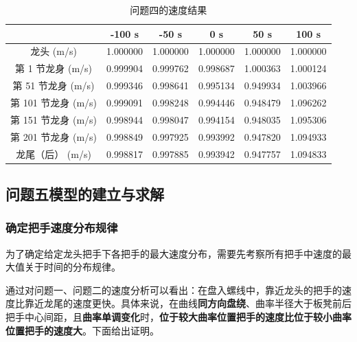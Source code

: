\documentclass[a4paper]{article}
\begin{document}
		\begin{table}[H] %
			\captionsetup{skip=4pt} %
			\caption{问题四的速度结果}
			\centering
			\setlength{\arrayrulewidth}{0.5pt} %
			\begin{tabular}{|c|c|c|c|c|c|} %
				\hline
				& -100 s & -50 s & 0 s & 50 s & 100 s \\ \hline
				龙头 (m/s)          & 1.000000 & 1.000000 & 1.000000 & 1.000000 & 1.000000 \\ \hline
				第 1 节龙身 (m/s)   & 0.999904 & 0.999762 & 0.998687 & 1.000363 & 1.000124 \\ \hline
				第 51 节龙身 (m/s)  & 0.999346 & 0.998641 & 0.995134 & 0.949934 & 1.003966 \\ \hline
				第 101 节龙身 (m/s) & 0.999091 & 0.998248 & 0.994446 & 0.948479 & 1.096262 \\ \hline
				第 151 节龙身 (m/s) & 0.998944 & 0.998047 & 0.994154 & 0.948035 & 1.095306 \\ \hline
				第 201 节龙身 (m/s) & 0.998849 & 0.997925 & 0.993992 & 0.947820 & 1.094933 \\ \hline
				龙尾（后） (m/s)    & 0.998817 & 0.997885 & 0.993942 & 0.947757 & 1.094833 \\ \hline
			\end{tabular}
		\end{table}
	
	\subsection{问题五模型的建立与求解}
	
	\subsubsection{确定把手速度分布规律}
	
		为了确定给定龙头把手下各把手的最大速度分布，需要先考察所有把手中速度的最大值关于时间的分布规律。
		
		通过对问题一、问题二的速度分析可以看出：在盘入螺线中，靠近龙头的把手的速度比靠近龙尾的速度更快。具体来说，在曲线\textbf{同方向盘绕}、曲率半径大于板凳前后把手中心间距，且\textbf{曲率单调变化}时，\textbf{位于较大曲率位置把手的速度比位于较小曲率位置把手的速度大}。下面给出证明。
		
\end{document}
